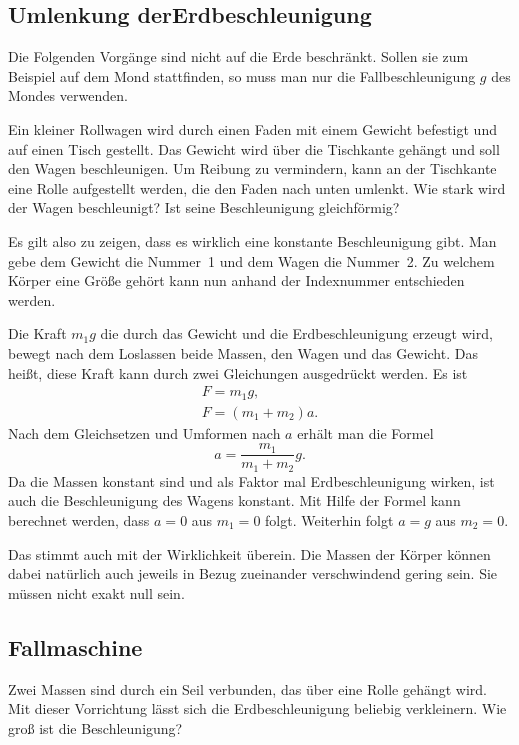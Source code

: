 \documentclass[a4paper,10pt,fleqn,twocolumn,twoside]{scrartcl}
\begin{document}
\subsection[Umlenkung der Erdbeschleunigung]
{Umlenkung der\newline Erdbeschleunigung}

Die Folgenden Vorgänge sind nicht auf die Erde beschränkt. Sollen
sie zum Beispiel auf dem Mond stattfinden, so muss man nur die
Fallbeschleunigung $g$ des Mondes verwenden.

Ein kleiner Rollwagen wird durch einen Faden mit einem Gewicht
befestigt und auf einen Tisch gestellt. Das Gewicht wird über die
Tischkante gehängt und soll den Wagen beschleunigen. Um Reibung zu
vermindern, kann an der Tischkante eine Rolle aufgestellt werden, die
den Faden nach unten umlenkt. Wie stark wird der Wagen beschleunigt?
Ist seine Beschleunigung gleichförmig?

Es gilt also zu zeigen, dass es wirklich eine konstante Beschleunigung
gibt. Man gebe dem Gewicht die Nummer~1 und dem Wagen die Nummer~2.
Zu welchem Körper eine Größe gehört kann nun anhand der Indexnummer
entschieden werden.

Die Kraft ${m_1}g$ die durch das Gewicht und die Erdbeschleunigung
erzeugt wird, bewegt nach dem Loslassen beide Massen, den Wagen und das
Gewicht. Das heißt, diese Kraft kann durch zwei Gleichungen ausgedrückt
werden. Es ist%
\begin{gather*}
F = {m_1}g,\\
F = (m_1+m_2)a.
\end{gather*}
Nach dem Gleichsetzen und Umformen nach $a$ erhält man die Formel%
\[a = \frac{m_1}{m_1+m_2} g.\]
Da die Massen konstant sind und als Faktor mal Erdbeschleunigung
wirken, ist auch die Beschleunigung des Wagens konstant. Mit Hilfe
der Formel kann berechnet werden, dass $a=0$ aus $m_1=0$ folgt.
Weiterhin folgt $a=g$ aus $m_2=0$.

Das stimmt auch mit der Wirklichkeit überein. Die Massen der Körper
können dabei natürlich auch jeweils in Bezug zueinander verschwindend
gering sein. Sie müssen nicht exakt null sein.

\subsection{Fallmaschine}

Zwei Massen sind durch ein Seil verbunden, das über eine Rolle gehängt
wird. Mit dieser Vorrichtung lässt sich die Erdbeschleunigung beliebig
verkleinern. Wie groß ist die Beschleunigung?
\end{document}
